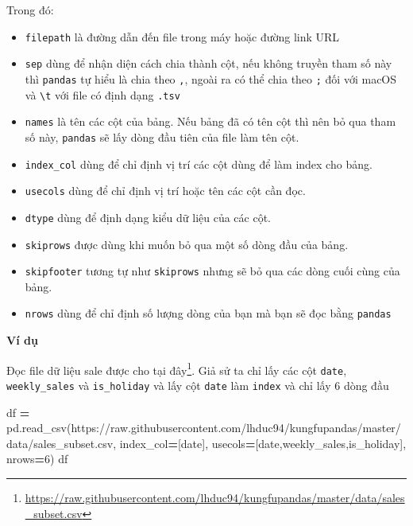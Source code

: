 \documentclass[
]{book}
\newenvironment{Shaded}{\begin{snugshade}}{\end{snugshade}}
\newcommand{\DecValTok}[1]{\textcolor[rgb]{0.00,0.00,0.81}{#1}}
\newcommand{\NormalTok}[1]{#1}
\newcommand{\OperatorTok}[1]{\textcolor[rgb]{0.81,0.36,0.00}{\textbf{#1}}}
\newcommand{\StringTok}[1]{\textcolor[rgb]{0.31,0.60,0.02}{#1}}
\renewcommand{\href}[2]{#2\footnote{\url{#1}}}
\begin{document}
Trong đó:

\begin{itemize}
\item
  \texttt{filepath} là đường dẫn đến file trong máy hoặc đường link URL
\item
  \texttt{sep} dùng để nhận diện cách chia thành cột, nếu không truyền tham số này thì \texttt{pandas} tự hiểu là chia theo \texttt{\textquotesingle{},\textquotesingle{}}, ngoài ra có thể chia theo \texttt{\textquotesingle{};\textquotesingle{}} đối với macOS và \texttt{\textquotesingle{}\textbackslash{}t\textquotesingle{}} với file có định dạng \texttt{.tsv}
\item
  \texttt{names} là tên các cột của bảng. Nếu bảng đã có tên cột thì nên bỏ qua tham số này, \texttt{pandas} sẽ lấy dòng đầu tiên của file làm tên cột.
\item
  \texttt{index\_col} dùng để chỉ định vị trí các cột dùng để làm index cho bảng.
\item
  \texttt{usecols} dùng để chỉ định vị trí hoặc tên các cột cần đọc.
\item
  \texttt{dtype} dùng để định dạng kiểu dữ liệu của các cột.
\item
  \texttt{skiprows} được dùng khi muốn bỏ qua một số dòng đầu của bảng.
\item
  \texttt{skipfooter} tương tự như \texttt{skiprows} nhưng sẽ bỏ qua các dòng cuối cùng của bảng.
\item
  \texttt{nrows} dùng để chỉ định số lượng dòng của bạn mà bạn sẽ đọc bằng \texttt{pandas}
\end{itemize}

\textbf{Ví dụ}

Đọc file dữ liệu sale được cho tại \href{https://raw.githubusercontent.com/lhduc94/kungfupandas/master/data/sales_subset.csv}{đây}. Giả sử ta chỉ lấy các cột \texttt{date}, \texttt{weekly\_sales} và \texttt{is\_holiday} và lấy cột \texttt{date} làm \texttt{index} và chỉ lấy 6 dòng đầu

\begin{Shaded}
\begin{Highlighting}[]
\NormalTok{df }\OperatorTok{=}\NormalTok{ pd.read\_csv(}\StringTok{\textquotesingle{}https://raw.githubusercontent.com/lhduc94/kungfupandas/master/data/sales\_subset.csv\textquotesingle{}}\NormalTok{, index\_col}\OperatorTok{=}\NormalTok{[}\StringTok{\textquotesingle{}date\textquotesingle{}}\NormalTok{], usecols}\OperatorTok{=}\NormalTok{[}\StringTok{\textquotesingle{}date\textquotesingle{}}\NormalTok{,}\StringTok{\textquotesingle{}weekly\_sales\textquotesingle{}}\NormalTok{,}\StringTok{\textquotesingle{}is\_holiday\textquotesingle{}}\NormalTok{], nrows}\OperatorTok{=}\DecValTok{6}\NormalTok{)}
\NormalTok{df}
\end{Highlighting}
\end{Shaded}
\end{document}
